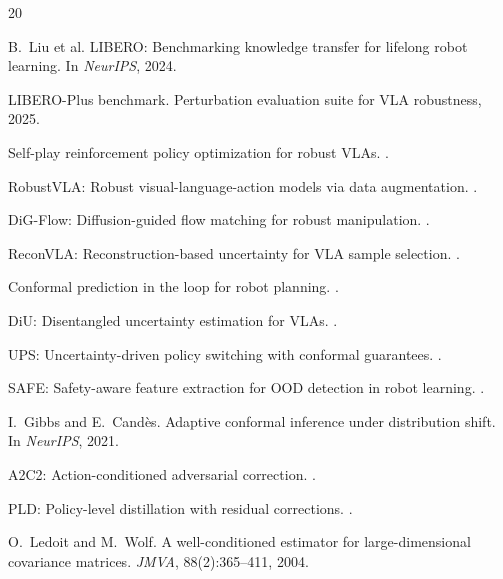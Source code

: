 \documentclass[letterpaper]{article}
\begin{document}
{\small

\begin{thebibliography}{20}

B.~Liu et al.
\newblock LIBERO: Benchmarking knowledge transfer for lifelong robot learning.
\newblock In \emph{NeurIPS}, 2024.

LIBERO-Plus benchmark.
\newblock Perturbation evaluation suite for VLA robustness, 2025.

Self-play reinforcement policy optimization for robust VLAs.
.

RobustVLA: Robust visual-language-action models via data augmentation.
.

DiG-Flow: Diffusion-guided flow matching for robust manipulation.
.

ReconVLA: Reconstruction-based uncertainty for VLA sample selection.
.

Conformal prediction in the loop for robot planning.
.

DiU: Disentangled uncertainty estimation for VLAs.
.

UPS: Uncertainty-driven policy switching with conformal guarantees.
.

SAFE: Safety-aware feature extraction for OOD detection in robot learning.
.

I.~Gibbs and E.~Cand\`{e}s.
\newblock Adaptive conformal inference under distribution shift.
\newblock In \emph{NeurIPS}, 2021.

A2C2: Action-conditioned adversarial correction.
.

PLD: Policy-level distillation with residual corrections.
.

O.~Ledoit and M.~Wolf.
\newblock A well-conditioned estimator for large-dimensional covariance matrices.
\newblock \emph{JMVA}, 88(2):365--411, 2004.

\end{thebibliography}
}
\end{document}
